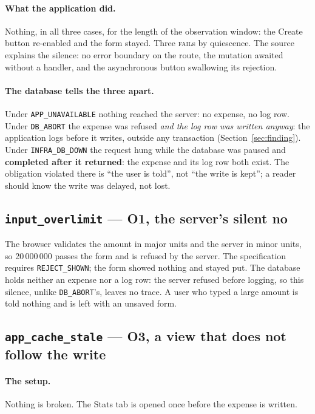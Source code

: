 \documentclass[11pt,a4paper]{article}
\newcommand{\gate}[1]{\texttt{\small #1}}
\newcommand{\obl}[1]{\textbf{O#1}}
\begin{document}
\paragraph{What the application did.}
Nothing, in all three cases, for the length of the observation window: the
Create button re-enabled and the form stayed. Three \textsc{fail}s by quiescence.
The source explains the silence: no error boundary on the route, the mutation
awaited without a handler, and the asynchronous button swallowing its rejection.

\paragraph{The database tells the three apart.}
Under \gate{APP\_UNAVAILABLE} nothing reached the server: no expense, no log row.
Under \gate{DB\_ABORT} the expense was refused \emph{and the log row was written
anyway}: the application logs before it writes, outside any transaction
(Section~\ref{sec:finding}). Under \gate{INFRA\_DB\_DOWN} the request hung while
the database was paused and \textbf{completed after it returned}: the expense and
its log row both exist. The obligation violated there is ``the user is told'',
not ``the write is kept''; a reader should know the write was delayed, not lost.

\subsection{\gate{input\_overlimit} --- \obl{1}, the server's silent no}

The browser validates the amount in major units and the server in minor units,
so 20\,000\,000 passes the form and is refused by the server. The specification
requires \gate{REJECT\_SHOWN}; the form showed nothing and stayed put. The
database holds neither an expense nor a log row: the server refused before
logging, so this silence, unlike \gate{DB\_ABORT}'s, leaves no trace. A user who
typed a large amount is told nothing and is left with an unsaved form.

\subsection{\gate{app\_cache\_stale} --- \obl{3}, a view that does not follow the write}
\label{sec:stale}

\paragraph{The setup.}
Nothing is broken. The Stats tab is opened once before the expense is written.
\end{document}
